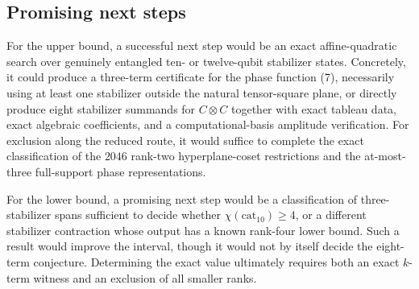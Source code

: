 \documentclass[11pt]{article}
\theoremstyle{definition}
\newcommand{\cat}{\mathrm{cat}}
\begin{document}
\subsection*{Promising next steps}

For the upper bound, a successful next step would be an exact affine-quadratic search over genuinely entangled ten- or twelve-qubit stabilizer states. Concretely, it could produce a three-term certificate for the phase function (7), necessarily using at least one stabilizer outside the natural tensor-square plane, or directly produce eight stabilizer summands for $C\otimes C$ together with exact tableau data, exact algebraic coefficients, and a computational-basis amplitude verification. For exclusion along the reduced route, it would suffice to complete the exact classification of the $2046$ rank-two hyperplane-coset restrictions and the at-most-three full-support phase representations.

For the lower bound, a promising next step would be a classification of three-stabilizer spans sufficient to decide whether $\chi(\cat_{10})\geq4$, or a different stabilizer contraction whose output has a known rank-four lower bound. Such a result would improve the interval, though it would not by itself decide the eight-term conjecture. Determining the exact value ultimately requires both an exact $k$-term witness and an exclusion of all smaller ranks.
\end{document}
